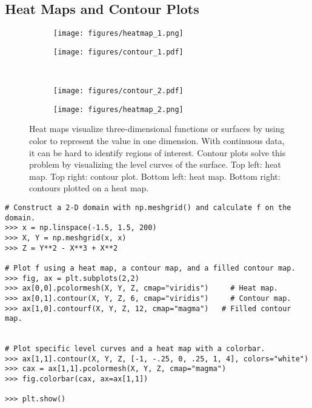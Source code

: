 \subsection*{Heat Maps and Contour Plots} %

\begin{figure}[H] %
    \centering
    \begin{subfigure}{.495\textwidth}
        \centering
        \texttt{[image: figures/heatmap\_1.png]}
    \end{subfigure}
    \begin{subfigure}{.495\textwidth}
        \centering
        \texttt{[image: figures/contour\_1.pdf]}
    \end{subfigure}
    \\
    \begin{subfigure}{.495\textwidth}
        \centering
        \texttt{[image: figures/contour\_2.pdf]}
    \end{subfigure}
    \begin{subfigure}{.495\textwidth}
        \centering
        \texttt{[image: figures/heatmap\_2.png]}
    \end{subfigure}
    \caption{Heat maps visualize three-dimensional functions or surfaces by using color to represent the value in one dimension. With continuous data, it can be hard to identify regions of interest. Contour plots solve this problem by visualizing the level curves of the surface. Top left: heat map. Top right: contour plot. Bottom left: heat map. Bottom right: contours plotted on a heat map.}
    \label{fig:heatcontour}
\end{figure}

\begin{lstlisting}
# Construct a 2-D domain with np.meshgrid() and calculate f on the domain.
>>> x = np.linspace(-1.5, 1.5, 200)
>>> X, Y = np.meshgrid(x, x)
>>> Z = Y**2 - X**3 + X**2

# Plot f using a heat map, a contour map, and a filled contour map.
>>> fig, ax = plt.subplots(2,2)
>>> ax[0,0].pcolormesh(X, Y, Z, cmap="viridis")     # Heat map.
>>> ax[0,1].contour(X, Y, Z, 6, cmap="viridis")     # Contour map.
>>> ax[1,0].contourf(X, Y, Z, 12, cmap="magma")   # Filled contour map.


# Plot specific level curves and a heat map with a colorbar.
>>> ax[1,1].contour(X, Y, Z, [-1, -.25, 0, .25, 1, 4], colors="white")
>>> cax = ax[1,1].pcolormesh(X, Y, Z, cmap="magma")
>>> fig.colorbar(cax, ax=ax[1,1])

>>> plt.show()
\end{lstlisting}

